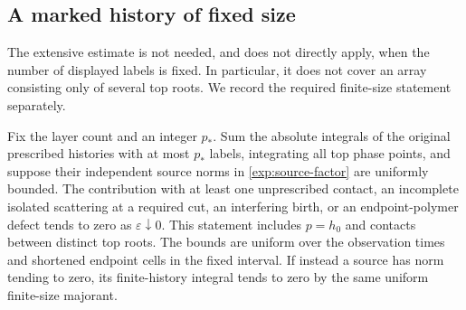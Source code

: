 \subsection{A marked history of fixed size}

The extensive estimate is not needed, and does not directly apply, when
the number of displayed labels is fixed.  In particular, it does not cover
an array consisting only of several top roots.  We record the required
finite-size statement separately.

\begin{corollary}
\label{exp:finite}
Fix the layer count and an integer $p_*$.  Sum the absolute integrals of the
original prescribed histories with at most $p_*$ labels, integrating all
top phase points, and suppose their independent source norms in
\eqref{exp:source-factor} are uniformly bounded.  The contribution with at
least one unprescribed contact, an incomplete isolated scattering at a
required cut, an interfering birth, or an endpoint-polymer defect tends to
zero as $\varepsilon\downarrow0$.  This statement includes $p=h_0$ and
contacts between distinct top roots.  The bounds are uniform over the
observation times and shortened endpoint cells in the fixed interval.
If instead a source has norm tending to zero, its finite-history integral
tends to zero by the same uniform finite-size majorant.
\end{corollary}

